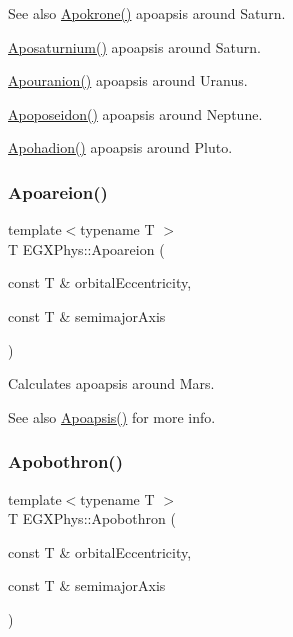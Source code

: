 \begin{DoxySeeAlso}{See also}
\hyperlink{group___e_g_x_phys-_apoapsis_ga98557a8d49aa129c29e652c4758334d1}{Apokrone()} apoapsis around Saturn. 

\hyperlink{group___e_g_x_phys-_apoapsis_gac157adc20a88c8616e4822eb819f9016}{Aposaturnium()} apoapsis around Saturn. 

\hyperlink{group___e_g_x_phys-_apoapsis_ga6efaf5c9379f1085fa6e51bf97356124}{Apouranion()} apoapsis around Uranus. 

\hyperlink{group___e_g_x_phys-_apoapsis_ga89679654fff13176e989536163a27f9d}{Apoposeidon()} apoapsis around Neptune. 

\hyperlink{group___e_g_x_phys-_apoapsis_gaa16847ddc5763c327067075dcb6a3353}{Apohadion()} apoapsis around Pluto. 
\end{DoxySeeAlso}
\mbox{\label{group___e_g_x_phys-_apoapsis_ga8d8ac5814f653e229e1d463b432ffca5}} 
\subsubsection{\texorpdfstring{Apoareion()}{Apoareion()}}
{\footnotesize\ttfamily template$<$typename T $>$ \\
T E\+G\+X\+Phys\+::\+Apoareion (\begin{DoxyParamCaption}\item[{const T \&}]{orbital\+Eccentricity,  }\item[{const T \&}]{semimajor\+Axis }\end{DoxyParamCaption})}



Calculates apoapsis around Mars. 

\begin{DoxySeeAlso}{See also}
\hyperlink{group___e_g_x_phys-_apoapsis_gaf962e650bf84a568458e8eb39b1c61ba}{Apoapsis()} for more info. 
\end{DoxySeeAlso}
\mbox{\label{group___e_g_x_phys-_apoapsis_ga6fe084b9e69f47a5032b05aa8f6bf7ad}} 
\subsubsection{\texorpdfstring{Apobothron()}{Apobothron()}}
{\footnotesize\ttfamily template$<$typename T $>$ \\
T E\+G\+X\+Phys\+::\+Apobothron (\begin{DoxyParamCaption}\item[{const T \&}]{orbital\+Eccentricity,  }\item[{const T \&}]{semimajor\+Axis }\end{DoxyParamCaption})}



